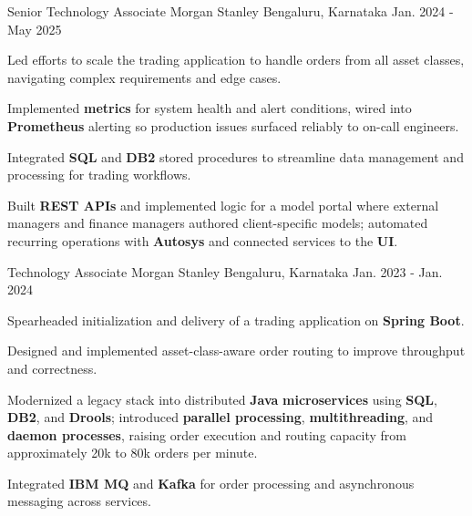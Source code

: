 \begin{cventries}
  \cventry
    {Senior Technology Associate} %
    {Morgan Stanley} %
    {Bengaluru, Karnataka} %
    {Jan. 2024 - May 2025} %
    {
      \begin{cvitems} %
        \item {Led efforts to scale the trading application to handle orders from all asset classes, navigating complex requirements and edge cases.}
        \item {Implemented \textbf{metrics} for system health and alert conditions, wired into \textbf{Prometheus} alerting so production issues surfaced reliably to on-call engineers.}
        \item {Integrated \textbf{SQL} and \textbf{DB2} stored procedures to streamline data management and processing for trading workflows.}
        \item {Built \textbf{REST APIs} and implemented logic for a model portal where external managers and finance managers authored client-specific models; automated recurring operations with \textbf{Autosys} and connected services to the \textbf{UI}.}
      \end{cvitems}
    }

  \cventry
    {Technology Associate} %
    {Morgan Stanley} %
    {Bengaluru, Karnataka} %
    {Jan. 2023 - Jan. 2024} %
    {
      \begin{cvitems} %
        \item {Spearheaded initialization and delivery of a trading application on \textbf{Spring Boot}.}
        \item {Designed and implemented asset-class-aware order routing to improve throughput and correctness.}
        \item {Modernized a legacy stack into distributed \textbf{Java} \textbf{microservices} using \textbf{SQL}, \textbf{DB2}, and \textbf{Drools}; introduced \textbf{parallel processing}, \textbf{multithreading}, and \textbf{daemon processes}, raising order execution and routing capacity from approximately 20k to 80k orders per minute.}
        \item {Integrated \textbf{IBM MQ} and \textbf{Kafka} for order processing and asynchronous messaging across services.}
      \end{cvitems}
    }


\end{cventries}
